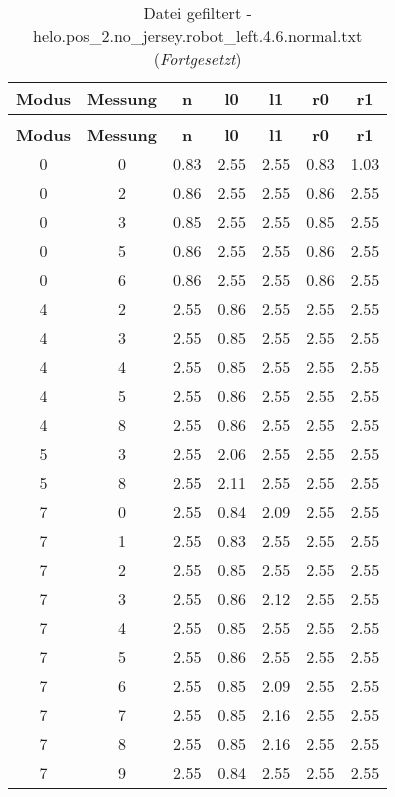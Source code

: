 \begin{longtable}{|c|c||c||c|c||c|c|}
	\caption{Datei gefiltert - helo.pos\_2.no\_jersey.robot\_left.4.6.normal.txt} \label{tab:helo.pos-2.no-jersey.robot-left.4.6.normal.txt} \\ \hline
	\textbf{Modus} & \textbf{Messung} & \textbf{n} & \textbf{l0} & \textbf{l1} & \textbf{r0} & \textbf{r1}\\ \hline
	\endfirsthead
	\caption[]{Datei gefiltert - helo.pos\_2.no\_jersey.robot\_left.4.6.normal.txt (\emph{Fortgesetzt})} \\ \hline
	\textbf{Modus} & \textbf{Messung} & \textbf{n} & \textbf{l0} & \textbf{l1} & \textbf{r0} & \textbf{r1}\\ \hline
	\endhead
	0 & 0 & 0.83 & 2.55 & 2.55 & 0.83 & 1.03 \\ \hline
	0 & 2 & 0.86 & 2.55 & 2.55 & 0.86 & 2.55 \\ \hline
	0 & 3 & 0.85 & 2.55 & 2.55 & 0.85 & 2.55 \\ \hline
	0 & 5 & 0.86 & 2.55 & 2.55 & 0.86 & 2.55 \\ \hline
	0 & 6 & 0.86 & 2.55 & 2.55 & 0.86 & 2.55 \\ \hline
	4 & 2 & 2.55 & 0.86 & 2.55 & 2.55 & 2.55 \\ \hline
	4 & 3 & 2.55 & 0.85 & 2.55 & 2.55 & 2.55 \\ \hline
	4 & 4 & 2.55 & 0.85 & 2.55 & 2.55 & 2.55 \\ \hline
	4 & 5 & 2.55 & 0.86 & 2.55 & 2.55 & 2.55 \\ \hline
	4 & 8 & 2.55 & 0.86 & 2.55 & 2.55 & 2.55 \\ \hline
	5 & 3 & 2.55 & 2.06 & 2.55 & 2.55 & 2.55 \\ \hline
	5 & 8 & 2.55 & 2.11 & 2.55 & 2.55 & 2.55 \\ \hline
	7 & 0 & 2.55 & 0.84 & 2.09 & 2.55 & 2.55 \\ \hline
	7 & 1 & 2.55 & 0.83 & 2.55 & 2.55 & 2.55 \\ \hline
	7 & 2 & 2.55 & 0.85 & 2.55 & 2.55 & 2.55 \\ \hline
	7 & 3 & 2.55 & 0.86 & 2.12 & 2.55 & 2.55 \\ \hline
	7 & 4 & 2.55 & 0.85 & 2.55 & 2.55 & 2.55 \\ \hline
	7 & 5 & 2.55 & 0.86 & 2.55 & 2.55 & 2.55 \\ \hline
	7 & 6 & 2.55 & 0.85 & 2.09 & 2.55 & 2.55 \\ \hline
	7 & 7 & 2.55 & 0.85 & 2.16 & 2.55 & 2.55 \\ \hline
	7 & 8 & 2.55 & 0.85 & 2.16 & 2.55 & 2.55 \\ \hline
	7 & 9 & 2.55 & 0.84 & 2.55 & 2.55 & 2.55 \\ \hline
\end{longtable}
